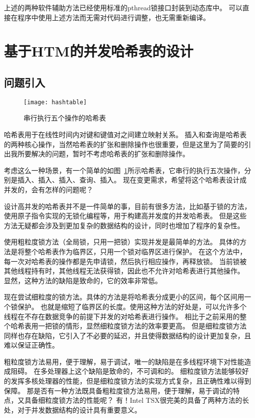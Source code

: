 上述的两种软件辅助方法已经使用标准的pthread锁接口封装到动态库中。
可以直接在程序中使用上述方法而无需对代码进行调整，也无需重新编译。


\section{基于HTM的并发哈希表的设计}

\subsection{问题引入}

\begin{figure}[htbp]
\centering
\texttt{[image: hashtable]}
\caption{串行执行五个操作的哈希表}\label{fig:hashtable}
\end{figure}

哈希表用于在线性时间内对键和键值对之间建立映射关系。
插入和查询是哈希表的两种核心操作，当然哈希表的扩张和删除操作也很重要，但是这里为了简要的引出我所要解决的问题，暂时不考虑哈希表的扩张和删除操作。

考虑这么一种场景，有一个简单的如图~\ref{fig:hashtable}所示哈希表，它串行的执行五次操作，分别是插入、插入、插入、查询、插入。
现在变更需求，希望将这个哈希表设计成并发的，会有怎样的问题呢？

设计高并发的哈希表并不是一件简单的事，目前有很多方法，比如基于锁的方法，使用原子指令实现的无锁化编程等，用于构建高并发度的并发哈希表。
但是这些方法无疑都会涉及到更加复杂的数据结构的设计，同时也增加了程序的复杂性。

使用粗粒度锁方法（全局锁，只用一把锁）实现并发是最简单的方法。
具体的方法是将整个哈希表作为临界区，只用一个锁对临界区进行保护。
在这个方法中，每一次对哈希表的操作都是先申请锁，然后执行相应操作，再释放锁。
当前锁被其他线程持有时，其他线程无法获得锁，因此也不允许对哈希表进行其他操作。
显然，这种方法的缺陷是致命的，它的效率非常低。

现在尝试细粒度的锁方法。具体的方法是将哈希表分成更小的区间，每个区间用一个锁保护。
也就是缩短了临界区的长度。使用这种方法的好处是，可以允许多个线程在不存在数据竞争的前提下并发的对哈希表进行操作。
相比于之前采用的整个哈希表用一把锁的情形，显然细粒度锁方法的效率要更高。
但是细粒度锁方法同样也存在缺陷，它引入了不必要的延迟，并且使得数据结构的设计更加复杂，且难以保证正确性。

粗粒度锁方法易用，便于理解，易于调试，唯一的缺陷是在多线程环境下对性能造成阻碍。
在多处理器上这个缺陷是致命的，不可调和的。
细粒度锁方法能够较好的发挥多核处理器的性能，但是细粒度锁方法的实现方式复杂，且正确性难以得到保障。
那是否有一种方法既具备粗粒度锁方法易用，便于理解，易于调试的特点，又具备细粒度锁方法的性能呢？
有！Intel TSX很完美的具备了两种方法的长处，对于并发数据结构的设计具有重要意义。

